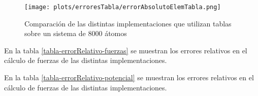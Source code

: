 \begin{figure}[htbp]
\centering
   \texttt{[image: plots/erroresTabla/errorAbsolutoElemTabla.png]}
 \caption{Comparaci\'on de las distintas implementaciones que utilizan tablas sobre un sistema de 8000 átomos }
 \label{errorAbsElemTabla}
\end{figure}





En la tabla \ref{tabla-errorRelativo-fuerzas} se muestran los errores relativos en el cálculo de fuerzas de las distintas implementaciones.



En la tabla \ref{tabla-errorRelativo-potencial} se muestran los errores relativos en el cálculo de fuerzas de las distintas implementaciones.





